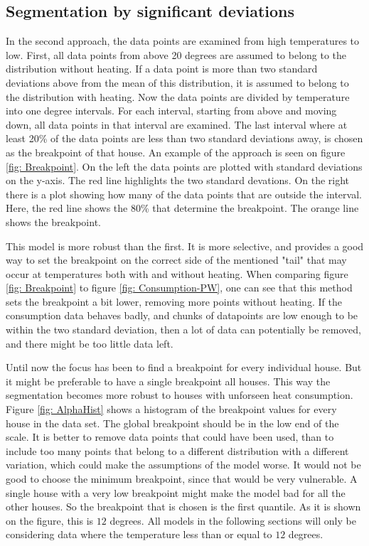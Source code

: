 \subsection{Segmentation by significant deviations}
In the second approach, the data points are examined from high temperatures to low. First, all data points from
above 20 degrees are assumed to belong to the distribution without heating. If a data point is more than two
standard deviations above from the mean of this distribution, it is assumed to belong to the distribution with
heating. Now the data points are divided by temperature into one degree intervals. For each interval, starting
from above and moving down, all data points in that interval are examined. The last interval where at least
20\% of the data points are less than two standard deviations away, is chosen as the breakpoint of that house.
An example of the approach is seen on figure \ref{fig: Breakpoint}. On the left the data points are plotted with
standard deviations on the y-axis. The red line highlights the two standard devations. On the right there is a plot
showing how many of the data points that are outside the interval. Here, the red line shows the 80\% that determine
the breakpoint. The orange line shows the breakpoint.

This model is more robust than the first. It is more selective, and provides a good way to set the
breakpoint on the correct side of the mentioned "tail" that may occur at temperatures both with and without heating.
When comparing figure \ref{fig: Breakpoint} to figure \ref{fig: Consumption-PW}, one can see that this method sets
the breakpoint a bit lower, removing more points without heating. If the consumption data behaves badly, and chunks
of datapoints are low enough to be within the two standard deviation, then a lot of data can potentially be removed,
and there might be too little data left.

Until now the focus has been to find a breakpoint for every individual house. But it might be preferable to have a
single breakpoint all houses. This way the segmentation becomes more robust to houses with unforseen heat consumption.
Figure \ref{fig: AlphaHist} shows a histogram of the breakpoint values for every house in the data set. The global
breakpoint should be in the low end of the scale. It is better to remove data points that could have been used, than
to include too many points that belong to a different distribution with a different variation, which could make the
assumptions of the model worse. It would not be good to choose the minimum breakpoint, since that would be very
vulnerable. A single house with a very low breakpoint might make the model bad for all the other houses. So the
breakpoint that is chosen is the first quantile. As it is shown on the figure, this is $12$ degrees. All models in
the following sections will only be considering data where the temperature less than or equal to $12$ degrees.


